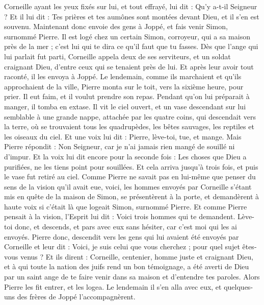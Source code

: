 \begin{multicols}{2}
Corneille ayant les yeux fixés sur lui, et tout effrayé, lui dit : Qu'y a-t-il Seigneur ? Et il lui dit : Tes prières et tes aumônes sont montées devant Dieu, et il s’en est souvenu.
Maintenant donc envoie des gens à Joppé, et fais venir Simon, surnommé Pierre.
Il est logé chez un certain Simon, corroyeur, qui a sa maison près de la mer ; c'est lui qui te dira ce qu'il faut que tu fasses.
Dès que l'ange qui lui parlait fut parti, Corneille appela deux de ses serviteurs, et un soldat craignant Dieu, d'entre ceux qui se tenaient près de lui.
Et après leur avoir tout raconté, il les envoya à Joppé.
Le lendemain, comme ils marchaient et qu'ils approchaient de la ville, Pierre monta sur le toit, vers la sixième heure, pour prier.
Il eut faim, et il voulut prendre son repas. Pendant qu’on lui préparait à manger, il tomba en extase.
Il vit le ciel ouvert, et un vase descendant sur lui semblable à une grande nappe, attachée par les quatre coins, qui descendait vers la terre,
où se trouvaient tous les quadrupèdes, les bêtes sauvages, les reptiles et les oiseaux du ciel.
Et une voix lui dit : Pierre, lève-toi, tue, et mange.
Mais Pierre répondit : Non Seigneur, car je n’ai jamais rien mangé de souillé ni d’impur.
Et la voix lui dit encore pour la seconde fois : Les choses que Dieu a purifiées, ne les tiens point pour souillées.
Et cela arriva jusqu’à trois fois, et puis le vase fut retiré au ciel.
Comme Pierre ne savait pas en lui-même que penser du sens de la vision qu’il avait eue, voici, les hommes envoyés par Corneille s’étant mis en quête de la maison de Simon, se présentèrent à la porte,
et demandèrent à haute voix si c’était là que logeait Simon, surnommé Pierre.
Et comme Pierre pensait à la vision, l'Esprit lui dit : Voici trois hommes qui te demandent.
Lève-toi donc, et descends, et pars avec eux sans hésiter, car c'est moi qui les ai envoyés.
Pierre donc, descendit vers les gens qui lui avaient été envoyés par Corneille et leur dit : Voici, je suis celui que vous cherchez ; pour quel sujet êtes-vous venus ?
Et ils dirent : Corneille, centenier, homme juste et craignant Dieu, et à qui toute la nation des juifs rend un bon témoignage, a été averti de Dieu par un saint ange de te faire venir dans sa maison et d’entendre tes paroles.
Alors Pierre les fit entrer, et les logea. Le lendemain il s'en alla avec eux, et quelques-uns des frères de Joppé l’accompagnèrent.

\end{multicols}
